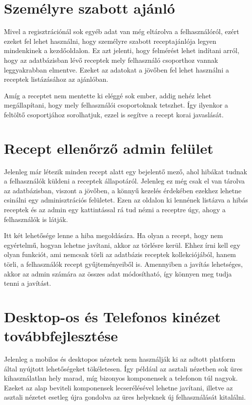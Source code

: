 \documentclass[12pt]{report}
\theoremstyle{definition}
\begin{document}
\section{Személyre szabott ajánló}
Mivel a regisztrációnál sok egyéb adat van még eltárolva a felhasználóról, ezért ezeket fel lehet használni, hogy személyre szabott receptajánlója legyen mindenkinek a kezdőoldalon. Ez azt jelenti, hogy felmérést lehet indítani arról, hogy az adatbázisban lévő receptek mely felhasználó csoporthoz vannak leggyakrabban elmentve. Ezeket az adatokat a jövőben fel lehet használni a  receptek listázásához az ajánlóban. 

Amíg a receptet nem mentette ki eléggé sok ember, addig nehéz lehet megállapítani, hogy mely felhasználói csoportoknak tetszhet. Így ilyenkor a feltöltő csoportjához sorolhatjuk, ezzel is segítve a recept korai javaslását.


\section{Recept ellenőrző admin felület}
Jelenleg már létezik minden recept alatt egy bejelentő mező, ahol hibákat tudnak a felhasználók küldeni a receptek állapotáról. Jelenleg ez még csak el van tárolva az adatbázisban, viszont a jövőben, a könnyű kezelés érdekében ezekhez lehetne csinálni egy adminisztrációs felületet. Ezen az oldalon ki lennének listázva a hibás receptek és az admin egy kattintással rá tud nézni a receptre úgy, ahogy a felhasználók is látják.

Itt két lehetősége lenne a hiba megoldására. Ha olyan a recept, hogy nem egyértelmű, hogyan lehetne javítani, akkor az törlésre kerül. Ehhez írni kell egy olyan funkciót, ami nemcsak törli az adatbázis receptek kollekciójából, hanem törli,  a felhasználók  recept gyűjteményeiből is. Amennyiben a javítás lehetséges, akkor az admin számára az összes adat módosítható, így könnyen meg tudja tenni a javítást.


\section{Desktop-os és Telefonos kinézet továbbfejlesztése}
Jelenleg a mobilos és desktopos nézetek nem használják ki az adtott platform által nyújtott lehetőségeket tökéletesen. Így például az asztali nézetben sok üres kihasználatlan hely marad, míg bizonyos komponensek a telefonon túl nagyok. Ezeket az alap beviteli komponensek lecserélésével lehetne javítani, illetve az asztali nézetet esetleg újra gondolva az üres helyeknek új felhasználását kitalálni.  
\end{document}

